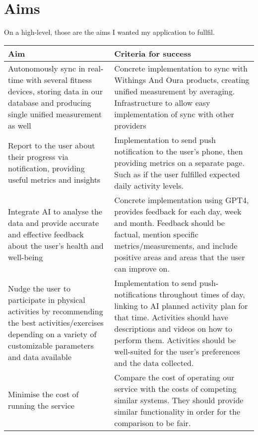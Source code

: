 \section{Aims}
On a high-level, those are the aims I wanted my application to fullfil.
\begin{center}
    \begin{tabularx}{1\textwidth} {| >{\centering\arraybackslash}X 
        | >{\centering\arraybackslash}X 
        |}
    \hline
    Aim & Criteria for success  \\ 
    \hline
     Autonomously sync in real-time with several fitness devices, storing data in our database and producing single unified measurement as well & Concrete implementation to sync with Withings And Oura products, creating unified measurement by averaging.  Infrastructure to allow easy implementation of sync with other providers\\ 
    \hline
     Report to the user about their progress via notification, providing useful metrics and insights & Implementation to send push notification to the user's phone, then providing metrics on a separate page. Such as if the user fulfilled expected daily activity levels. \\ 
    \hline
     Integrate AI to analyse the data and provide accurate and effective feedback about the user's health and well-being & Concrete implementation using GPT4, provides feedback for each day, week and month. Feedback should be factual, mention specific metrics/measurements, and include positive areas and areas that the user can improve on.\\
    \hline
     Nudge the user to participate in physical activities by recommending the best activities/exercises depending on a variety of customizable parameters and data available &  Implementation to send push-notifications throughout times of day, linking to AI planned activity plan for that time. Activities should have descriptions and videos on how to perform them. Activities should be well-suited for the user's preferences and the data collected.\\
    \hline
     Minimise the cost of running the service & Compare the cost of operating our service with the costs of competing similar systems. They should provide similar functionality in order for the comparison to be fair. \\
    \hline
    \end{tabularx}
\end{center}



